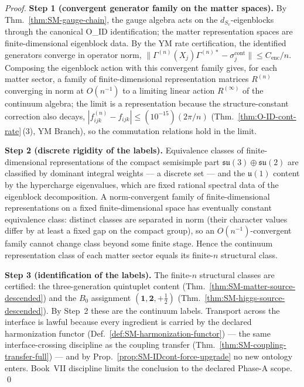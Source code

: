 \documentclass[12pt,oneside]{amsbook}
\theoremstyle{plain}
\theoremstyle{definition}
\theoremstyle{remark}
\begin{document}
\begin{proof}
\textbf{Step 1 (convergent generator family on the matter
spaces).} By Thm.~\ref{thm:SM-gauge-chain}, the gauge algebra acts
on the $d_{S_v}$-eigenblocks through the canonical O\_ID
identification; the matter representation spaces are
finite-dimensional eigenblock data.  By the YM rate certification,
the identified generators converge in operator norm,
$\|\Gamma^{(n)}(X_j)\Gamma^{(n)*} - \sigma_j^{\mathrm{cont}}\|
\le C_{\mathrm{enc}}/n$.  Composing the eigenblock action with
this convergent family gives, for each matter sector, a family of
finite-dimensional representation matrices
$R^{(n)}$ converging in norm at $O(n^{-1})$ to a limiting linear
action $R^{(\infty)}$ of the continuum algebra; the limit is a
representation because the structure-constant correction also
decays, $|f_{ijk}^{(n)} - f_{ijk}| \le (10^{-15})(2\pi/n)$
(Thm.~\ref{thm:O-ID-cont-rate}\,(3), YM Branch), so the
commutation relations hold in the limit.

\textbf{Step 2 (discrete rigidity of the labels).}  Equivalence
classes of finite-dimensional representations of the compact
semisimple part $\mathfrak{su}(3)\oplus\mathfrak{su}(2)$ are
classified by dominant integral weights --- a discrete set --- and
the $\mathfrak{u}(1)$ content by the hypercharge eigenvalues, which
are fixed rational spectral data of the eigenblock decomposition.
A norm-convergent family of finite-dimensional representations on
a fixed finite-dimensional space has eventually constant
equivalence class: distinct classes are separated in norm (their
character values differ by at least a fixed gap on the compact
group), so an $O(n^{-1})$-convergent family cannot change class
beyond some finite stage.  Hence the continuum representation
class of each matter sector equals its finite-$n$ structural
class.

\textbf{Step 3 (identification of the labels).}  The finite-$n$
structural classes are certified: the three-generation quintuplet
content (Thm.~\ref{thm:SM-matter-source-descended}) and the $B_0$
assignment $(\mathbf{1},\mathbf{2},+\tfrac12)$
(Thm.~\ref{thm:SM-higgs-source-descended}).  By Step~2 these are
the continuum labels.  Transport across the interface is lawful
because every ingredient is carried by the declared harmonization
functor (Def.~\ref{def:SM-harmonization-functor}) --- the same
interface-crossing discipline as the coupling transfer
(Thm.~\ref{thm:SM-coupling-transfer-full}) --- and by
Prop.~\ref{prop:SM-IDcont-force-upgrade} no new ontology enters.
Book~VII discipline limits the conclusion to the declared Phase-A
scope. \qed
\end{proof}
\end{document}
